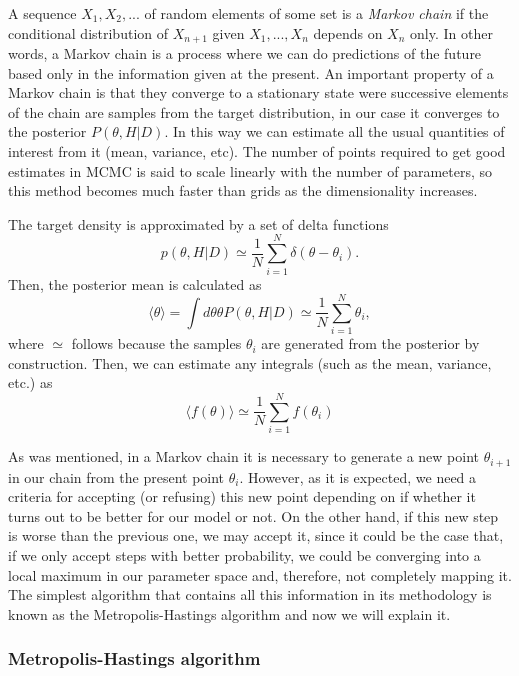 \documentclass[onecolumn,           %
               showpacs,            %
               preprintnumbers,     %
               aps,                 %
               prl,          	    %
               letterpaper,             %
               superscriptaddress,      %
               nofootinbib,         %
               tightenlines,        %
               floats,floatfix      %
               ,usenatbib,
               ]{revtex4-1}
\begin{document}
A sequence $X_1,X_2,...$ of random elements of some set is a \textit{Markov chain} if the conditional distribution of $X_{n+1}$ given $X_1,...,X_n$ depends on $X_n$ only. In other words, a Markov chain is a process where we can do predictions of the future based only in the information given at the present. An important property of a Markov chain is that they converge to a stationary state were successive elements of the chain are samples from the target distribution, in our case it converges to the posterior $P(\theta,H|D)$. In this way we can estimate all the usual quantities of interest from it (mean, variance, etc). The number of points required to get good estimates in MCMC is said to scale linearly with the number of parameters, so this method becomes much faster than grids as the dimensionality increases.

The target density is approximated by a set of delta functions
\begin{equation}
p(\theta,H|D)\simeq \frac{1}{N}\sum_{i=1}^N \delta(\theta-\theta_i).
\end{equation}
Then, the posterior mean is calculated as
\begin{equation}
\langle\theta\rangle=\int d\theta \theta P(\theta,H|D)\simeq \frac{1}{N}\sum_{i=1}^N\theta_i ,
\end{equation}
where $\simeq$ follows because the samples $\theta_i$ are generated from the posterior by construction. Then, we can estimate any integrals (such as the mean, variance, etc.) as
\begin{equation}
\langle f(\theta)\rangle \simeq\frac{1}{N}\sum_{i=1}^N f(\theta_i)
\end{equation}

As was mentioned, in a Markov chain it is necessary to generate a new point $\theta_{i+1}$ in our chain from the present point $\theta_i$. However, as it is expected, we need a criteria for accepting (or refusing) this new point depending on if whether it turns out to be better for our model or not. On the other hand, if this new step is worse than the previous one, we may accept it, since it could be the case that, if we only accept steps with better probability, we could be converging into a local maximum in our parameter space and, therefore, not completely mapping it. The simplest algorithm that contains all this information in its methodology is known as the Metropolis-Hastings algorithm and now we will explain it.
\subsubsection{Metropolis-Hastings algorithm}
\end{document}
